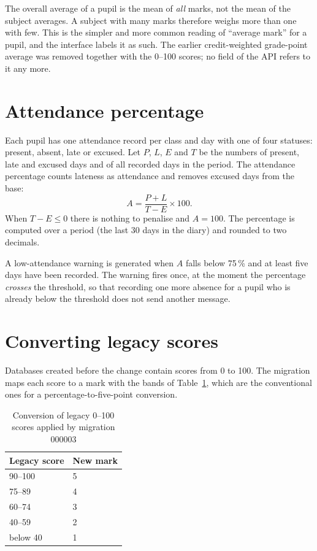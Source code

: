 The overall average of a pupil is the mean of \emph{all} marks, not the mean of the subject averages. A subject with many marks therefore weighs more than one with few. This is the simpler and more common reading of ``average mark'' for a pupil, and the interface labels it as such. The earlier credit-weighted grade-point average was removed together with the 0--100 scores; no field of the API refers to it any more.

\section{Attendance percentage}

Each pupil has one attendance record per class and day with one of four statuses: present, absent, late or excused. Let $P$, $L$, $E$ and $T$ be the numbers of present, late and excused days and of all recorded days in the period. The attendance percentage counts lateness as attendance and removes excused days from the base:
\begin{equation}
A = \frac{P + L}{T - E}\times 100 .
\end{equation}
When $T - E \le 0$ there is nothing to penalise and $A = 100$. The percentage is computed over a period (the last 30 days in the diary) and rounded to two decimals.

A low-attendance warning is generated when $A$ falls below 75\,\% and at least five days have been recorded. The warning fires once, at the moment the percentage \emph{crosses} the threshold, so that recording one more absence for a pupil who is already below the threshold does not send another message.

\section{Converting legacy scores}
\label{sec:conversion}

Databases created before the change contain scores from 0 to 100. The migration maps each score to a mark with the bands of Table~\ref{tab:conversion}, which are the conventional ones for a percentage-to-five-point conversion.

\begin{table}[H]
\centering
\caption{Conversion of legacy 0--100 scores applied by migration 000003}
\label{tab:conversion}
\begin{tabular}{@{}ll@{}}
\toprule
Legacy score & New mark \\
\midrule
90--100 & 5 \\
75--89 & 4 \\
60--74 & 3 \\
40--59 & 2 \\
below 40 & 1 \\
\bottomrule
\end{tabular}
\end{table}

